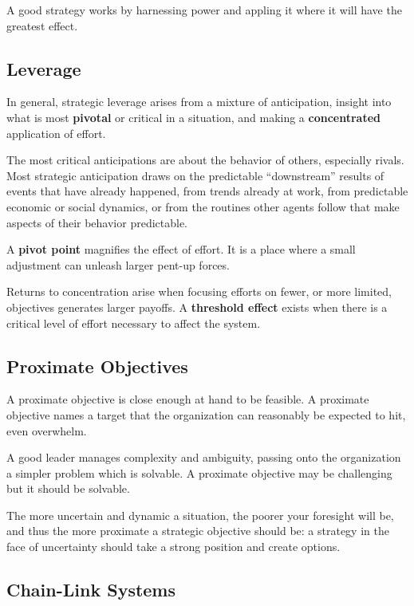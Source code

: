 \documentclass{article}
\begin{document}
\begin{multicols}{2}

\noindent
A good strategy works by harnessing power and appling it where it will have the greatest effect.

\subsection{Leverage}
In general, strategic leverage arises from a mixture of anticipation, insight into what is most \textbf{pivotal} or critical in a situation, and making a \textbf{concentrated} application of effort.

The most critical anticipations are about the behavior of others, especially rivals. Most strategic anticipation draws on the predictable “downstream” results of events that have already happened, from trends already at work, from predictable economic or social dynamics, or from the routines other agents follow that make aspects of their behavior predictable.

A \textbf{pivot point} magnifies the effect of effort. It is a place where a small adjustment can unleash larger pent-up forces.

Returns to concentration arise when focusing efforts on fewer, or more limited, objectives generates larger payoffs. A \textbf{threshold effect} exists when there is a critical level of effort necessary to affect the system.

\subsection{Proximate Objectives}

A proximate objective is close enough at hand to be feasible. A proximate objective names a target that the organization can reasonably be expected to hit, even overwhelm.

A good leader manages complexity and ambiguity, passing onto the organization a simpler problem which is solvable. A proximate objective may be challenging but it should be solvable.

The more uncertain and dynamic a situation, the poorer your foresight will be, and thus the more proximate a strategic objective should be: a strategy in the face of uncertainty should take a strong position and create options.

\subsection{Chain-Link Systems}


\end{multicols}
\end{document}
